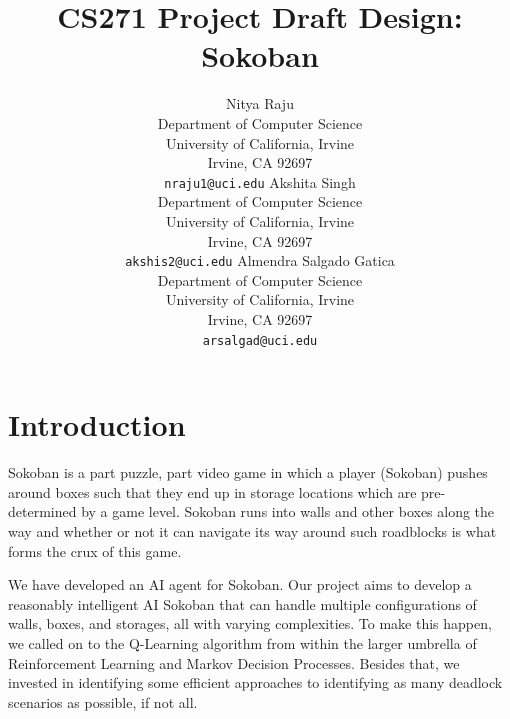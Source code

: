 \documentclass{article}
\title{CS271 Project Draft Design: Sokoban}
\author{
  Nitya Raju\\
  Department of Computer Science\\
  University of California, Irvine\\
  Irvine, CA 92697\\
  \texttt{nraju1@uci.edu} 
   \And
  Akshita Singh \\
  Department of Computer Science\\
  University of California, Irvine\\
  Irvine, CA 92697\\
  \texttt{akshis2@uci.edu} 
   \And
  Almendra Salgado Gatica \\
  Department of Computer Science\\
  University of California, Irvine\\
  Irvine, CA 92697\\
  \texttt{arsalgad@uci.edu} 
}
\begin{document}
\maketitle



\section{Introduction}

Sokoban is a part puzzle, part video game in which a player (Sokoban) pushes around boxes such that they end up in storage locations which are pre-determined by a game level. Sokoban runs into walls and other boxes along the way and whether or not it can navigate its way around such roadblocks is what forms the crux of this game. 

We have developed an AI agent for Sokoban. Our project aims to develop a reasonably intelligent AI Sokoban that can handle multiple configurations of walls, boxes, and storages, all with varying complexities. To make this happen, we called on to the Q-Learning algorithm from within the larger umbrella of Reinforcement Learning and Markov Decision Processes. Besides that, we invested in identifying some efficient approaches to identifying as many deadlock scenarios as possible, if not all. 


\end{document}
